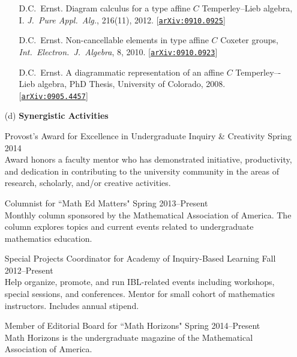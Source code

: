 \documentclass[11pt]{article}
\begin{document}
\begin{enumerate}[leftmargin=*]
\begin{enumerate}[leftmargin=\parindent]
\vspace{.25em}

D.C.~Ernst.  Diagram calculus for a type affine $C$ Temperley--Lieb algebra, I. \emph{J.~Pure Appl.~Alg.}, 216(11), 2012. [\href{http://arxiv.org/abs/0910.0925}{\texttt{arXiv:0910.0925}}]

\vspace{.25em}

D.C.~Ernst.  Non-cancellable elements in type affine $C$ Coxeter groups,  \emph{Int.~Electron.~J.~Algebra}, 8, 2010.  [\href{http://arxiv.org/abs/0910.0923}{\texttt{arXiv:0910.0923}}]

\vspace{.25em}

D.C.~Ernst. A diagrammatic representation of an affine $C$ Temperley–-Lieb algebra, PhD Thesis, University of Colorado, 2008. [\href{http://arxiv.org/abs/0905.4457}{\texttt{arXiv:0905.4457}}]

\end{enumerate}
 
\item[(d)] \textbf{Synergistic Activities}

Provost's Award for Excellence in Undergraduate Inquiry \& Creativity \hfill Spring 2014\\
Award honors a faculty mentor who has demonstrated initiative, productivity, and dedication in contributing to the university community in the areas of research, scholarly, and/or creative activities.

\vspace{.25em}

Columnist for ``Math Ed Matters" \hfill Spring 2013--Present\\
Monthly column sponsored by the Mathematical Association of America. The column explores topics and current events related to undergraduate mathematics education. 

\vspace{.25em}

Special Projects Coordinator for Academy of Inquiry-Based Learning \hfill Fall 2012--Present\\
Help organize, promote, and run IBL-related events including workshops, special sessions, and conferences. Mentor for small cohort of mathematics instructors.  Includes annual stipend.

\vspace{.25em}

Member of Editorial Board for ``Math Horizons" \hfill Spring 2014--Present\\
Math Horizons is the undergraduate magazine of the Mathematical Association of America.


\end{enumerate}
\end{document}
